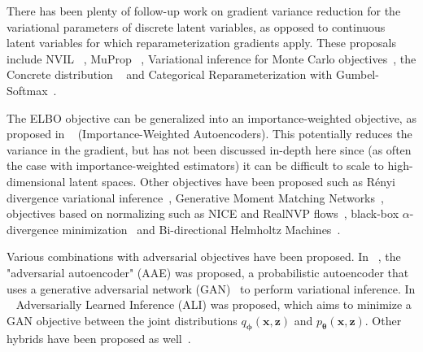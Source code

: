 \documentclass[MAL,biber]{nowfnt} %
\newcommand{\bb}[1]{\mathbf{#1}}
\newcommand{\bx}{\bb{x}}
\newcommand{\bz}{\bb{z}}
\newcommand{\bT}{\boldsymbol{\theta}}
\newcommand{\bphi}{\boldsymbol{\phi}}
\newcommand{\pT}{p_{\bT}}
\newcommand{\qPhi}{q_{\bphi}}
\begin{document}
There has been plenty of follow-up work on gradient variance reduction for the variational parameters of discrete latent variables, as opposed to continuous latent variables for which reparameterization gradients apply. These proposals include NVIL ~\citep{mnih2014neural}, MuProp ~\citep{gu2015muprop}, Variational inference for Monte Carlo objectives~\citep{mnih2016variational}, the Concrete distribution ~\citep{maddison2016concrete} and Categorical Reparameterization with Gumbel-Softmax~\citep{jang2016categorical}.

The ELBO objective can be generalized into an importance-weighted objective, as proposed in ~\citep{burda2015importance} (Importance-Weighted Autoencoders). This potentially reduces the variance in the gradient, but has not been discussed in-depth here since (as often the case with importance-weighted estimators) it can be difficult to scale to high-dimensional latent spaces. Other objectives have been proposed such as R\'enyi divergence variational inference~\citep{li2016renyi}, Generative Moment Matching Networks~\citep{li2015generative}, objectives based on normalizing such as NICE and RealNVP flows~\citep{sohl2015deep,dinh2014nice}, black-box $\alpha$-divergence minimization~\citep{hernandez2016black} and Bi-directional Helmholtz Machines~\citep{bornschein2016bidirectional}.

Various combinations with adversarial objectives have been proposed. In ~\citep{makhzani2015adversarial}, the "adversarial autoencoder" (AAE) was proposed, a probabilistic autoencoder that uses a generative adversarial network (GAN)~\citep{goodfellow2014generative} to perform variational inference. In ~\citep{dumoulin2016adversarially} Adversarially Learned Inference (ALI) was proposed, which aims to minimize a GAN objective between the joint distributions $\qPhi(\bx,\bz)$ and $\pT(\bx,\bz)$. Other hybrids have been proposed as well~\citep{larsen2015autoencoding,brock2016neural,hsu2017voice}. 
\end{document}
